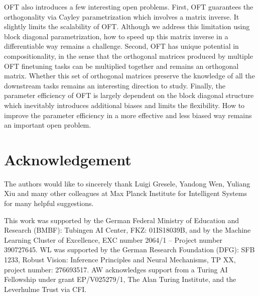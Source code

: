 \documentclass{article}
\begin{document}
OFT also introduces a few interesting open problems. First, OFT guarantees the orthogonality via Cayley parametrization which involves a matrix inverse. It slightly limits the scalability of OFT. Although we address this limitation using block diagonal parametrization, how to speed up this matrix inverse in a differentiable way remains a challenge. Second, OFT has unique potential in compositionality, in the sense that the orthogonal matrices produced by multiple OFT finetuning tasks can be multiplied together and remains an orthogonal matrix. Whether this set of orthogonal matrices preserve the knowledge of all the downstream tasks remains an interesting direction to study. Finally, the parameter efficiency of OFT is largely dependent on the block diagonal structure which inevitably introduces additional biases and limits the flexibility. How to improve the parameter efficiency in a more effective and less biased way remains an important open problem.

\newpage
\section*{Acknowledgement}
\vspace{-1.5mm}

The authors would like to sincerely thank Luigi Gresele, Yandong Wen, Yuliang Xiu and many other colleagues at Max Planck Institute for Intelligent Systems for many helpful suggestions.

This work was supported by the German Federal Ministry of Education and Research (BMBF): Tubingen AI Center, FKZ: 01IS18039B, and by the Machine Learning Cluster of Excellence, EXC number 2064/1 – Project number 390727645. WL was supported by the German Research Foundation (DFG): SFB 1233, Robust Vision: Inference Principles and Neural Mechanisms, TP XX, project number: 276693517. AW acknowledges support from a Turing AI Fellowship under grant EP/V025279/1, The Alan Turing Institute, and the Leverhulme Trust via CFI.

{
\footnotesize


}



\end{document}
